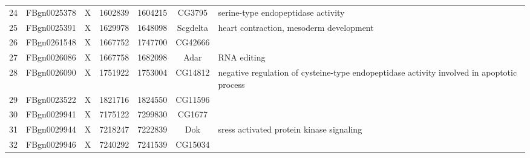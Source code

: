 \begin{tabular}{c|c|c|c|c|c | p{4in}}
24	&FBgn0025378	&X	&1602839	&1604215	&CG3795 & serine-type 
endopeptidase activity\\
25	&FBgn0025391	&X	&1629978	&1648098	&Scgdelta & heart contraction, 
mesoderm development\\
26	&FBgn0261548	&X	&1667752	&1747700	&CG42666\\
27	&FBgn0026086	&X	&1667758	&1682098	&Adar & RNA editing\\
28	&FBgn0026090	&X	&1751922	&1753004	&CG14812 & negative regulation 
of cysteine-type endopeptidase activity involved in apoptotic process\\
29	&FBgn0023522	&X	&1821716	&1824550	&CG11596&\\
30	&FBgn0029941	&X	&7175122	&7299830	&CG1677\\
31	&FBgn0029944	&X	&7218247	&7222839	&Dok & sress activated protein 
kinase signaling\\
32	&FBgn0029946	&X	&7240292	&7241539	&CG15034\\
\end{tabular}
